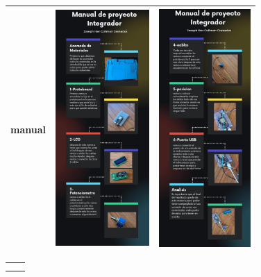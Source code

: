     \begin{table} [H]
          
      \huge
      \tiny 
      \begin{tabular}   {| c |  c |  c | }
      
     
     \hline 
      manual  &  \includegraphics[height=90mm]{7/img/ikerv1.jpg}  & 
       \includegraphics[width=35mm]{7/img/ikerv2.jpg} \\
        \hline
         
        \end{tabular} 
       
         \label {tab:my_label2}  \label {7/}
          \end{table} 
    
      \begin{tabular}{c|c}
           &  \\
           & 
      \end{tabular}  
        
